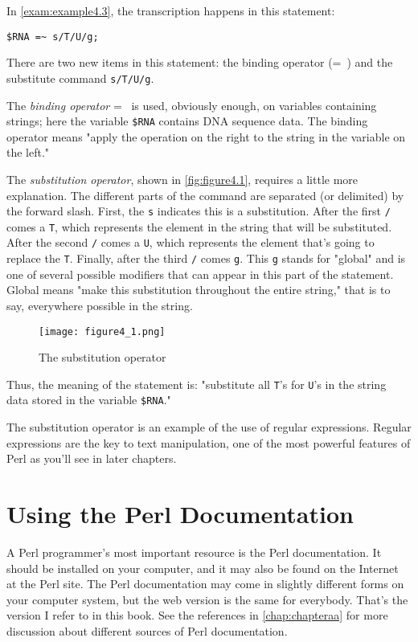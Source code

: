 In \autoref{exam:example4.3}, the transcription happens in this statement:

\begin{lstlisting}
$RNA =~ s/T/U/g;
\end{lstlisting}

There are two new items in this statement: the binding operator (=~) and the substitute command \verb|s/T/U/g|.

The \textit{binding operator} =~ is used, obviously enough, on variables containing strings; here the variable \verb|$RNA| contains DNA sequence data. The binding operator means "apply the operation on the right to the string in the variable on the left."

The \textit{substitution operator}, shown in \autoref{fig:figure4.1}, requires a little more explanation. The different parts of the command are separated (or delimited) by the forward slash. First, the \verb|s| indicates this is a substitution. After the first \verb|/| comes a \verb|T|, which represents the element in the string that will be substituted. After the second \verb|/| comes a \verb|U|, which represents the element that's going to replace the \verb|T|. Finally, after the third \verb|/| comes \verb|g|. This \verb|g| stands for "global" and is one of several possible modifiers that can appear in this part of the statement. Global means "make this substitution throughout the entire string," that is to say, everywhere possible in the string. 

\begin{figure}
  \centering
  \texttt{[image: figure4\_1.png]}
  \caption{The substitution operator}
  \label{fig:figure4.1}
\end{figure}

Thus, the meaning of the statement is: "substitute all \verb|T|'s for \verb|U|'s in the string data stored in the variable \verb|$RNA|."

The substitution operator is an example of the use of regular expressions. Regular expressions are the key to text manipulation, one of the most powerful features of Perl as you'll see in later chapters. 

\section{Using the Perl Documentation}
A Perl programmer's most important resource is the Perl documentation. It should be installed on your computer, and it may also be found on the Internet at the Perl site. The Perl documentation may come in slightly different forms on your computer system, but the web version is the same for everybody. That's the version I refer to in this book. See the references in \autoref{chap:chapteraa} for more discussion about different sources of Perl documentation.

